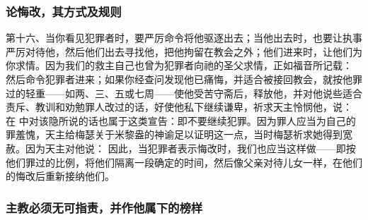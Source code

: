 
\subsubsection{论悔改，其方式及规则}

第十六、当你看见犯罪者时，要严厉命令将他驱逐出去；当他出去时，也要让执事严厉对待他，然后他们出去寻找他，把他拘留在教会之外；他们进来时，让他们为你求情。因为我们的救主自己也曾为犯罪者向祂的圣父求情，正如福音所记载： 然后命令犯罪者进来；如果你经查问发现他已痛悔，并适合被接回教会，就按他罪过的轻重——如两、三、五或七周——使他受苦守斋后，释放他，并对他说些适合责斥、教训和劝勉罪人改过的话，好使他私下继续谦卑，祈求天主怜悯他，说： 在  中对该隐所说的话也属于这类宣告：即不要继续犯罪。因为罪人应当为自己的罪羞愧，天主给梅瑟关于米黎盎的神谕足以证明这一点，当时梅瑟祈求她得到宽赦。因为天主对他说： 因此，当犯罪者表示悔改时，我们也应当这样做——即按他们罪过的比例，将他们隔离一段确定的时间，然后像父亲对待儿女一样，在他们的悔改后重新接纳他们。\par


\subsubsection{主教必须无可指责，并作他属下的榜样}

